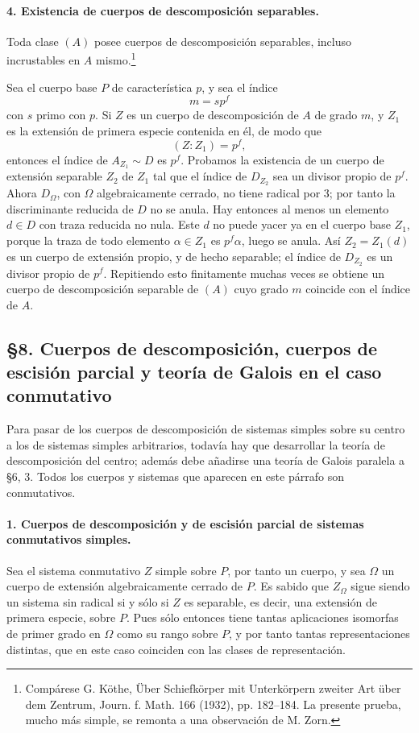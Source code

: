 \paragraph{4. Existencia de cuerpos de descomposición separables.}
Toda clase \((A)\) posee cuerpos de descomposición separables, incluso incrustables en \(A\) mismo.\footnote{Compárese G. Köthe, Über Schiefkörper mit Unterkörpern zweiter Art über dem Zentrum, Journ. f. Math. 166 (1932), pp. 182--184. La presente prueba, mucho más simple, se remonta a una observación de M. Zorn.}

Sea el cuerpo base \(P\) de característica \(p\), y sea el índice
\[
        m=s p^f
\]
con \(s\) primo con \(p\). Si \(Z\) es un cuerpo de descomposición de \(A\) de grado \(m\), y \(Z_1\) es la extensión de primera especie contenida en él, de modo que
\[
        (Z:Z_1)=p^f,
\]
entonces el índice de \(A_{Z_1}\sim D\) es \(p^f\). Probamos la existencia de un cuerpo de extensión separable \(Z_2\) de \(Z_1\) tal que el índice de \(D_{Z_2}\) sea un divisor propio de \(p^f\). Ahora \(D_\Omega\), con \(\Omega\) algebraicamente cerrado, no tiene radical por 3; por tanto la discriminante reducida de \(D\) no se anula. Hay entonces al menos un elemento \(d\in D\) con traza reducida no nula. Este \(d\) no puede yacer ya en el cuerpo base \(Z_1\), porque la traza de todo elemento \(\alpha\in Z_1\) es \(p^f\alpha\), luego se anula. Así \(Z_2=Z_1(d)\) es un cuerpo de extensión propio, y de hecho separable; el índice de \(D_{Z_2}\) es un divisor propio de \(p^f\). Repitiendo esto finitamente muchas veces se obtiene un cuerpo de descomposición separable de \((A)\) cuyo grado \(m\) coincide con el índice de \(A\).

\subsection*{§8. Cuerpos de descomposición, cuerpos de escisión parcial y teoría de Galois en el caso conmutativo}

Para pasar de los cuerpos de descomposición de sistemas simples sobre su centro a los de sistemas simples arbitrarios, todavía hay que desarrollar la teoría de descomposición del centro; además debe añadirse una teoría de Galois paralela a §6, 3. Todos los cuerpos y sistemas que aparecen en este párrafo son conmutativos.

\paragraph{1. Cuerpos de descomposición y de escisión parcial de sistemas conmutativos simples.}
Sea el sistema conmutativo \(Z\) simple sobre \(P\), por tanto un cuerpo, y sea \(\Omega\) un cuerpo de extensión algebraicamente cerrado de \(P\). Es sabido que \(Z_\Omega\) sigue siendo un sistema sin radical si y sólo si \(Z\) es separable, es decir, una extensión de primera especie, sobre \(P\). Pues sólo entonces tiene tantas aplicaciones isomorfas de primer grado en \(\Omega\) como su rango sobre \(P\), y por tanto tantas representaciones distintas, que en este caso coinciden con las clases de representación.

